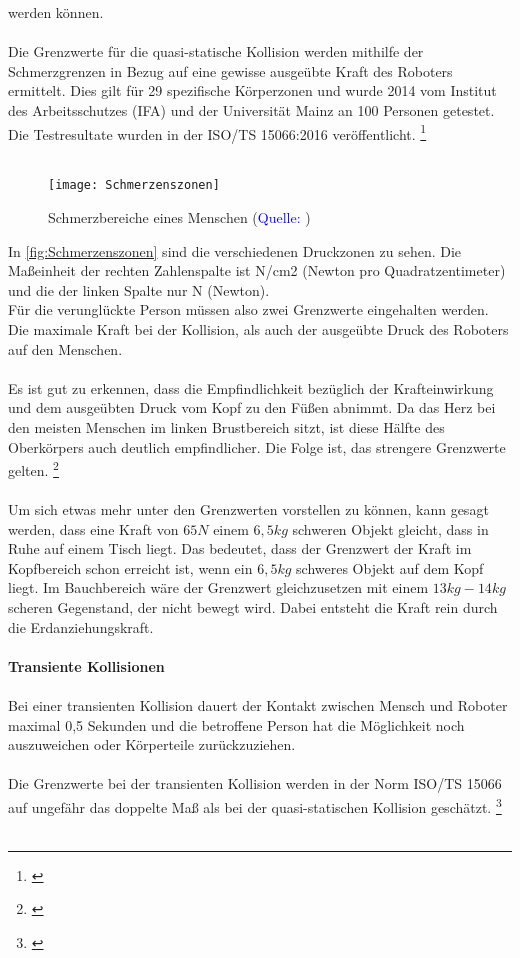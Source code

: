 \documentclass[titlepage,12pt,twoside]{article}
\begin{document}
werden können. \\
\\
Die Grenzwerte für die quasi-statische Kollision werden mithilfe der 
Schmerzgrenzen in Bezug auf eine gewisse ausgeübte Kraft des Roboters ermittelt. 
Dies gilt für 29 spezifische Körperzonen und wurde 2014 vom Institut des 
Arbeitsschutzes (IFA) und der Universität Mainz an 100 Personen getestet. Die 
Testresultate wurden in der ISO/TS 15066:2016 veröffentlicht. \footnote{\cite{Frauenhofer17}} \\
\\
\begin{figure}[H]
	\begin{center}
		\scalebox{0.5}
		{\texttt{[image: Schmerzenszonen]}}
		\caption{Schmerzbereiche eines Menschen (\textcolor{blue}{Quelle: \cite{Frauenhofer18}})}
		\label{fig:Schmerzenszonen}
	\end{center}
\end{figure}
\hfill \break
In \autoref{fig:Schmerzenszonen} sind die verschiedenen Druckzonen zu sehen. Die 
Maßeinheit der rechten Zahlenspalte ist N/cm2 (Newton pro Quadratzentimeter) und 
die der linken Spalte nur N (Newton). \\
Für die verunglückte Person müssen also zwei Grenzwerte eingehalten werden. Die 
maximale Kraft bei der Kollision, als auch der ausgeübte Druck des Roboters auf 
den Menschen. \\
\\
Es ist gut zu erkennen, dass die Empfindlichkeit bezüglich der Krafteinwirkung 
und dem ausgeübten Druck vom Kopf zu den Füßen abnimmt. Da das Herz bei den 
meisten Menschen im linken Brustbereich sitzt, ist diese Hälfte des Oberkörpers 
auch deutlich empfindlicher. Die Folge ist, das strengere Grenzwerte gelten. \footnote{\cite{Frauenhofer18}} \\
\\
Um sich etwas mehr unter den Grenzwerten vorstellen zu können, kann gesagt werden, 
dass eine Kraft von $65N$ einem $6,5kg$ schweren Objekt gleicht, dass in Ruhe auf 
einem Tisch liegt. Das bedeutet, dass der Grenzwert der Kraft im Kopfbereich 
schon erreicht ist, wenn ein $6,5kg$ schweres Objekt auf dem Kopf liegt. Im 
Bauchbereich wäre der Grenzwert gleichzusetzen mit einem $13kg-14kg$ scheren 
Gegenstand, der nicht bewegt wird. Dabei entsteht die Kraft rein durch die 
Erdanziehungskraft. \\
\\
\hfill \break
\hfill \break
\hfill \break
\textbf{Transiente Kollisionen} \\
\\
Bei einer transienten Kollision dauert der Kontakt zwischen Mensch und Roboter 
maximal 0,5 Sekunden und die betroffene Person hat die Möglichkeit noch 
auszuweichen oder Körperteile zurückzuziehen. \\
\\
Die Grenzwerte bei der transienten Kollision werden in der Norm ISO/TS 15066 auf 
ungefähr das doppelte Maß als bei der quasi-statischen Kollision geschätzt. \footnote{\cite{Frauenhofer17}} \\
\\
\end{document}
